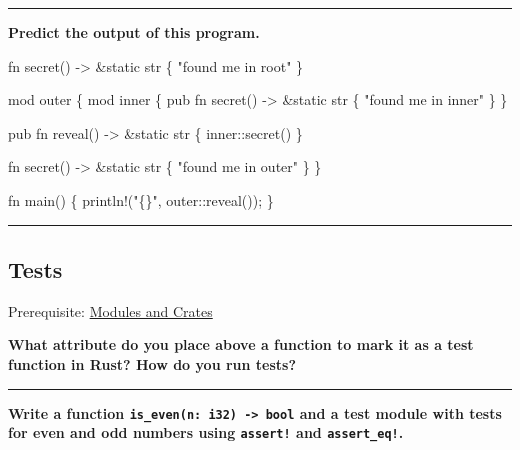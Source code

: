 \documentclass[
  11pt,
]{article}
\newenvironment{Shaded}{}{}
\newcommand{\NormalTok}[1]{#1}
\begin{document}
\begin{center}\rule{0.5\linewidth}{0.5pt}\end{center}

\textbf{Predict the output of this program.}

\begin{Shaded}
\begin{Highlighting}[]
\NormalTok{fn secret() {-}\textgreater{} \&\textquotesingle{}static str \{}
\NormalTok{    "found me in root"}
\NormalTok{\}}

\NormalTok{mod outer \{}
\NormalTok{    mod inner \{}
\NormalTok{        pub fn secret() {-}\textgreater{} \&\textquotesingle{}static str \{}
\NormalTok{            "found me in inner"}
\NormalTok{        \}}
\NormalTok{    \}}

\NormalTok{    pub fn reveal() {-}\textgreater{} \&\textquotesingle{}static str \{}
\NormalTok{        inner::secret()}
\NormalTok{    \}}

\NormalTok{    fn secret() {-}\textgreater{} \&\textquotesingle{}static str \{}
\NormalTok{        "found me in outer"}
\NormalTok{    \}}
\NormalTok{\}}

\NormalTok{fn main() \{}
\NormalTok{    println!("\{\}", outer::reveal());}
\NormalTok{\}}
\end{Highlighting}
\end{Shaded}

\begin{center}\rule{0.5\linewidth}{0.5pt}\end{center}

\subsection{Tests}\label{tests}

Prerequisite: \hyperref[modules-and-crates]{Modules and Crates}

\textbf{What attribute do you place above a function to mark it as a
test function in Rust? How do you run tests?}

\begin{center}\rule{0.5\linewidth}{0.5pt}\end{center}

\textbf{Write a function
\texttt{is\_even(n:\ i32)\ -\textgreater{}\ bool} and a test module with
tests for even and odd numbers using \texttt{assert!} and
\texttt{assert\_eq!}.}

\begin{Shaded}
\begin{Highlighting}[]

\end{Highlighting}
\end{Shaded}
\end{document}
